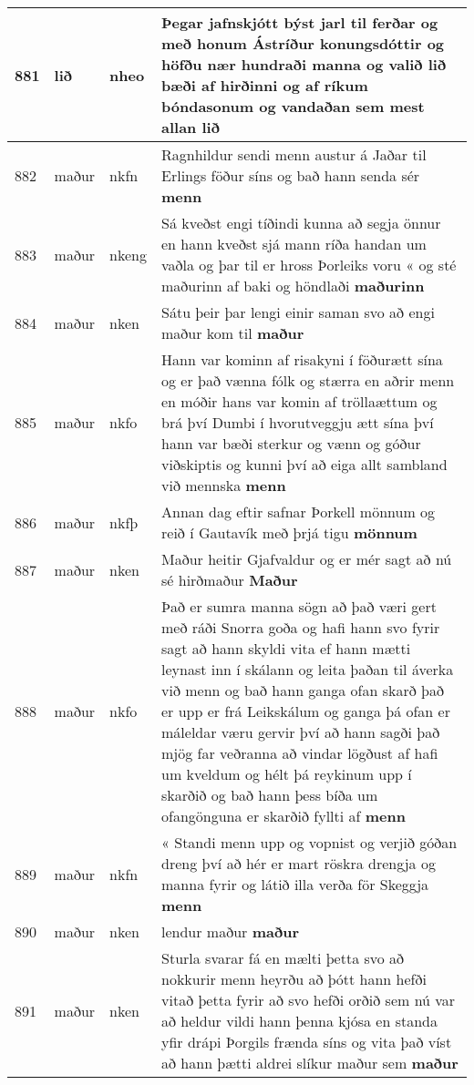 \documentclass{article}
\begin{document}
\begin{longtable}{p{1cm}|p{1cm}|p{1cm}|p{13cm}}
\hline
881&lið&nheo&Þegar jafnskjótt býst jarl til ferðar og með honum Ástríður konungsdóttir og höfðu nær hundraði manna og valið lið bæði af hirðinni og af ríkum bóndasonum og vandaðan sem mest allan \textbf{lið} \\
\hline
882&maður&nkfn&Ragnhildur sendi menn austur á Jaðar til Erlings föður síns og bað hann senda sér \textbf{menn} \\
\hline
883&maður&nkeng&Sá kveðst engi tíðindi kunna að segja önnur en hann kveðst sjá mann ríða handan um vaðla og þar til er hross Þorleiks voru « og sté maðurinn af baki og höndlaði \textbf{maðurinn} \\
\hline
884&maður&nken&Sátu þeir þar lengi einir saman svo að engi maður kom til \textbf{maður} \\
\hline
885&maður&nkfo&Hann var kominn af risakyni í föðurætt sína og er það vænna fólk og stærra en aðrir menn en móðir hans var komin af tröllaættum og brá því Dumbi í hvorutveggju ætt sína því hann var bæði sterkur og vænn og góður viðskiptis og kunni því að eiga allt sambland við mennska \textbf{menn} \\
\hline
886&maður&nkfþ&Annan dag eftir safnar Þorkell mönnum og reið í Gautavík með þrjá tigu \textbf{mönnum} \\
\hline
887&maður&nken&Maður heitir Gjafvaldur og er mér sagt að nú sé hirðmaður \textbf{Maður} \\
\hline
888&maður&nkfo&Það er sumra manna sögn að það væri gert með ráði Snorra goða og hafi hann svo fyrir sagt að hann skyldi vita ef hann mætti leynast inn í skálann og leita þaðan til áverka við menn og bað hann ganga ofan skarð það er upp er frá Leikskálum og ganga þá ofan er máleldar væru gervir því að hann sagði það mjög far veðranna að vindar lögðust af hafi um kveldum og hélt þá reykinum upp í skarðið og bað hann þess bíða um ofangönguna er skarðið fyllti af \textbf{menn} \\
\hline
889&maður&nkfn&« Standi menn upp og vopnist og verjið góðan dreng því að hér er mart röskra drengja og manna fyrir og látið illa verða för Skeggja \textbf{menn} \\
\hline
890&maður&nken&lendur maður \textbf{maður} \\
\hline
891&maður&nken&Sturla svarar fá en mælti þetta svo að nokkurir menn heyrðu að þótt hann hefði vitað þetta fyrir að svo hefði orðið sem nú var að heldur vildi hann þenna kjósa en standa yfir drápi Þorgils frænda síns og vita það víst að hann þætti aldrei slíkur maður sem \textbf{maður} \\

\end{longtable}
\end{document}
